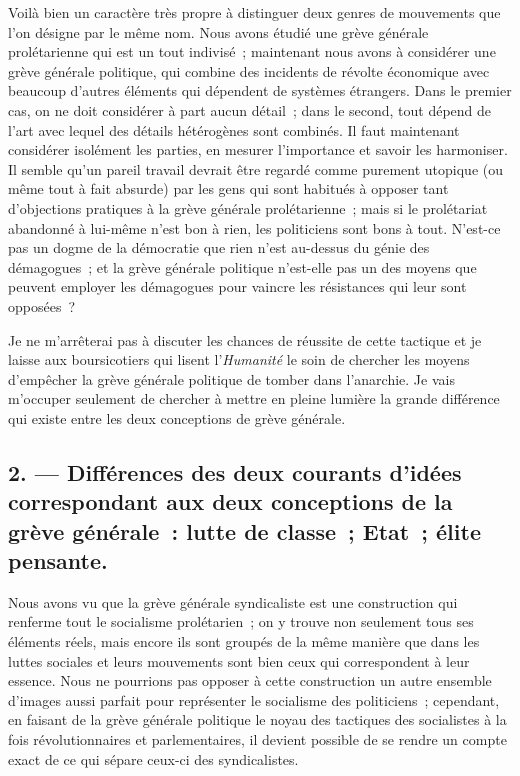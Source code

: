 \documentclass[french,twoside]{book} %
\begin{document}
\noindent Voilà bien un caractère très propre à distinguer deux genres de mouvements que l’on désigne par le même nom. Nous avons étudié une grève générale prolétarienne qui est un tout indivisé ; maintenant nous avons à considérer une grève générale politique, qui combine des incidents de révolte économique avec beaucoup d’autres éléments qui dépendent de systèmes étrangers. Dans le premier cas, on ne doit considérer à part aucun détail ; dans le second, tout dépend de l’art avec lequel des détails hétérogènes sont combinés. Il faut maintenant considérer isolément les parties, en mesurer l’importance et savoir les harmoniser. Il semble qu’un pareil travail devrait être regardé comme purement utopique (ou même tout à fait absurde) par les gens qui sont habitués à opposer tant d’objections pratiques à la grève générale prolétarienne ; mais si le prolétariat abandonné à lui-même n’est bon à rien, les politiciens sont bons à tout. N’est-ce pas un dogme de la démocratie que rien n’est au-dessus du génie des démagogues ; et la grève générale politique n’est-elle pas un des moyens que peuvent employer les démagogues pour vaincre les résistances qui leur sont opposées ?\par
Je ne m’arrêterai pas à discuter les chances de réussite de cette tactique et je laisse aux boursicotiers qui lisent l’\emph{Humanité} le soin de chercher les moyens d’empêcher la grève générale politique de tomber dans l’anarchie. Je vais m’occuper seulement de chercher à mettre en pleine  lumière la grande différence qui existe entre les deux conceptions de grève générale.
\subsection[{2. — Différences des deux courants d’idées correspondant aux deux conceptions de la grève générale : lutte de classe ; Etat ; élite pensante.}]{2. — Différences des deux courants d’idées correspondant aux deux conceptions de la grève générale : lutte de classe ; Etat ; élite pensante.}
\label{p21}
\noindent Nous avons vu que la grève générale syndicaliste est une construction qui renferme tout le socialisme prolétarien ; on y trouve non seulement tous ses éléments réels, mais encore ils sont groupés de la même manière que dans les luttes sociales et leurs mouvements sont bien ceux qui correspondent à leur essence. Nous ne pourrions pas opposer à cette construction un autre ensemble d’images aussi parfait pour représenter le socialisme des politiciens ; cependant, en faisant de la grève générale politique le noyau des tactiques des socialistes à la fois révolutionnaires et parlementaires, il devient possible de se rendre un compte exact de ce qui sépare ceux-ci des syndicalistes.\par
\end{document}
